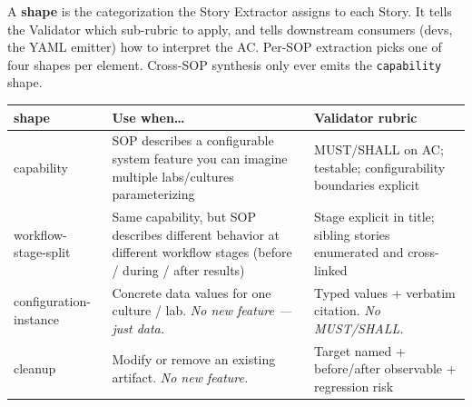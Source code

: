 \documentclass[10pt,letterpaper]{article}
\begin{document}
A \textbf{shape} is the categorization the Story Extractor assigns to each Story. It tells the Validator which sub-rubric to apply, and tells downstream consumers (devs, the YAML emitter) how to interpret the AC. Per-SOP extraction picks one of four shapes per element. Cross-SOP synthesis only ever emits the \texttt{capability} shape.

\begin{tabularx}{\textwidth}{@{}>{\ttfamily}p{3.2cm}p{6.5cm}X@{}}
\toprule
\textbf{shape} & \textbf{Use when\ldots} & \textbf{Validator rubric} \\
\midrule
capability & SOP describes a configurable system feature you can imagine multiple labs/cultures parameterizing & MUST/SHALL on AC; testable; configurability boundaries explicit \\
workflow-stage-split & Same capability, but SOP describes different behavior at different workflow stages (before / during / after results) & Stage explicit in title; sibling stories enumerated and cross-linked \\
configuration-instance & Concrete data values for one culture / lab. \emph{No new feature --- just data.} & Typed values + verbatim citation. \emph{No MUST/SHALL.} \\
cleanup & Modify or remove an existing artifact. \emph{No new feature.} & Target named + before/after observable + regression risk \\
\bottomrule
\end{tabularx}
\end{document}
